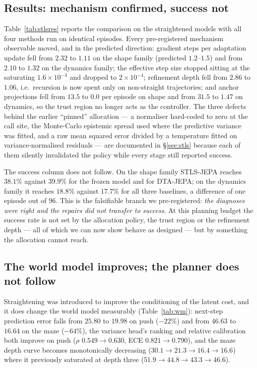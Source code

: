 
\subsection{Results: mechanism confirmed, success not}\label{sec:stlsres}

Table~\ref{tab:stlsres} reports the comparison on the straightened models with all four methods
run on identical episodes. Every pre-registered mechanism observable moved, and in the predicted
direction: gradient steps per adaptation update fell from $2.32$ to $1.11$ on the shape family
(predicted $1.2$--$1.5$) and from $2.10$ to $1.32$ on the dynamics family; the effective step size
stopped sitting at the saturating $1.6\times10^{-3}$ and dropped to $2\times10^{-4}$; refinement
depth fell from $2.86$ to $1.06$, i.e.\ recursion is now spent only on non-straight trajectories;
and anchor projections fell from $13.5$ to $0.0$ per episode on shape and from $31.5$ to $1.47$ on
dynamics, so the trust region no longer acts as the controller. The three defects behind the
earlier ``pinned'' allocation --- a normaliser hard-coded to zero at the call site, the
Monte-Carlo epistemic spread used where the predictive variance was fitted, and a raw mean squared
error divided by a temperature fitted on variance-normalised residuals --- are documented in
\S\ref{sec:stls} because each of them silently invalidated the policy while every stage still
reported success.

The success column does not follow. On the shape family STLS-JEPA reaches $38.1\%$ against $39.9\%$
for the frozen model and for DTA-JEPA; on the dynamics family it reaches $18.8\%$ against $17.7\%$
for all three baselines, a difference of one episode out of $96$. This is the falsifiable branch we
pre-registered: \emph{the diagnoses were right and the repairs did not transfer to success}. At this
planning budget the success rate is not set by the allocation policy, the trust region or the
refinement depth --- all of which we can now show behave as designed --- but by something the
allocation cannot reach.



\subsection{The world model improves; the planner does not follow}

Straightening was introduced to improve the conditioning of the latent cost, and it does change the
world model measurably (Table~\ref{tab:wm}): next-step prediction error falls from $25.80$ to
$19.98$ on push ($-22\%$) and from $46.63$ to $16.64$ on the maze ($-64\%$), the variance head's
ranking and relative calibration both improve on push ($\rho$ $0.549\to0.630$, ECE $0.821\to0.790$),
and the maze depth curve becomes monotonically decreasing ($30.1\to21.3\to16.4\to16.6$) where it
previously saturated at depth three ($51.9\to44.8\to43.3\to46.6$).

